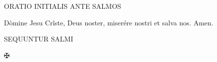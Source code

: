 \skipH

{\formatTextNoteSection\bfseries

  {\centering ORATIO INITIALIS ANTE SALMOS \par}

}

\setlength{\parindent}{2.5em}

\skipI

\skipI

\skipI

\skipI

\skipI


\skipI

\skipI

\skipI


\skipI



\newpage

\skipI

{Dòmine Jesu Crîste, Deus noster, miserére nostri et salva nos. Amen.}\skipI


\skipI

\skipI

\skipI

\setlength{\parindent}{0em}

\vfill

{\formatTextNoteSection\bfseries

  {\centering SEQUUNTUR SALMI \par}

}

\vfill

{\hfill\Huge ✠\hfill}

\vfill

\newpage
